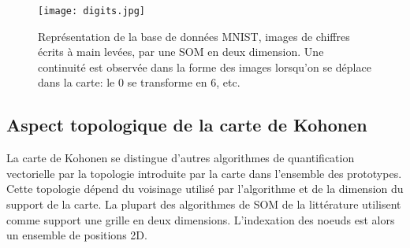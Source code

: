 \documentclass[../main]{subfiles}
\begin{document}



\begin{figure}
\centering
\texttt{[image: digits.jpg]}
\caption{Représentation de la base de données MNIST, images de chiffres écrits à main levées, par une SOM en deux dimension. Une continuité est observée dans la forme des images lorsqu'on se déplace dans la carte: le $0$ se transforme en $6$, etc.}
\label{fig:SOM}
\end{figure}

\subsection{Aspect topologique de la carte de Kohonen}

La carte de Kohonen se distingue d'autres algorithmes de quantification vectorielle par la topologie introduite par la carte dans l'ensemble des prototypes. Cette topologie dépend du voisinage utilisé par l'algorithme et de la dimension du support de la carte.
La plupart des algorithmes de SOM de la littérature utilisent comme support une grille en deux dimensions. L'indexation des noeuds est alors un ensemble de positions 2D.
\end{document}
